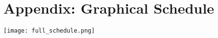 \section{Appendix: Graphical Schedule}

\newpage
\begin{landscape}
	\centering
	{\texttt{[image: full\_schedule.png]}}
\end{landscape}